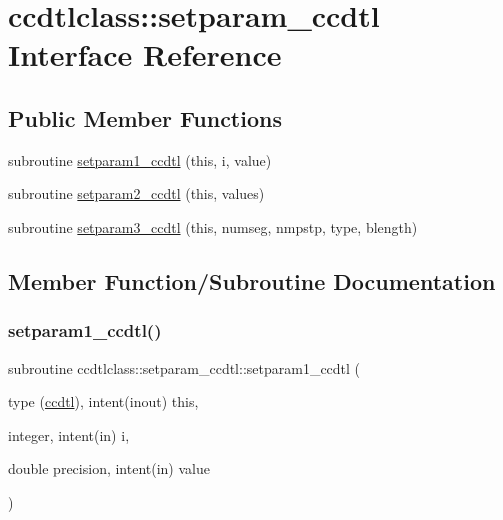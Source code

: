 \hypertarget{interfaceccdtlclass_1_1setparam__ccdtl}{}\section{ccdtlclass\+::setparam\+\_\+ccdtl Interface Reference}
\label{interfaceccdtlclass_1_1setparam__ccdtl}
\subsection*{Public Member Functions}
\begin{DoxyCompactItemize}
\item 
subroutine \mbox{\hyperlink{interfaceccdtlclass_1_1setparam__ccdtl_a5135a5543ffa395cd8608c75bddadf75}{setparam1\+\_\+ccdtl}} (this, i, value)
\item 
subroutine \mbox{\hyperlink{interfaceccdtlclass_1_1setparam__ccdtl_a513ec7eca6a1159d6363d806496dd083}{setparam2\+\_\+ccdtl}} (this, values)
\item 
subroutine \mbox{\hyperlink{interfaceccdtlclass_1_1setparam__ccdtl_a8931b36eaa0fbc593beaf7e6556f61e4}{setparam3\+\_\+ccdtl}} (this, numseg, nmpstp, type, blength)
\end{DoxyCompactItemize}


\subsection{Member Function/\+Subroutine Documentation}
\mbox{\label{interfaceccdtlclass_1_1setparam__ccdtl_a5135a5543ffa395cd8608c75bddadf75}} 
\subsubsection{\texorpdfstring{setparam1\_ccdtl()}{setparam1\_ccdtl()}}
{\footnotesize\ttfamily subroutine ccdtlclass\+::setparam\+\_\+ccdtl\+::setparam1\+\_\+ccdtl (\begin{DoxyParamCaption}\item[{type (\mbox{\hyperlink{namespaceccdtlclass_structccdtlclass_1_1ccdtl}{ccdtl}}), intent(inout)}]{this,  }\item[{integer, intent(in)}]{i,  }\item[{double precision, intent(in)}]{value }\end{DoxyParamCaption})}

